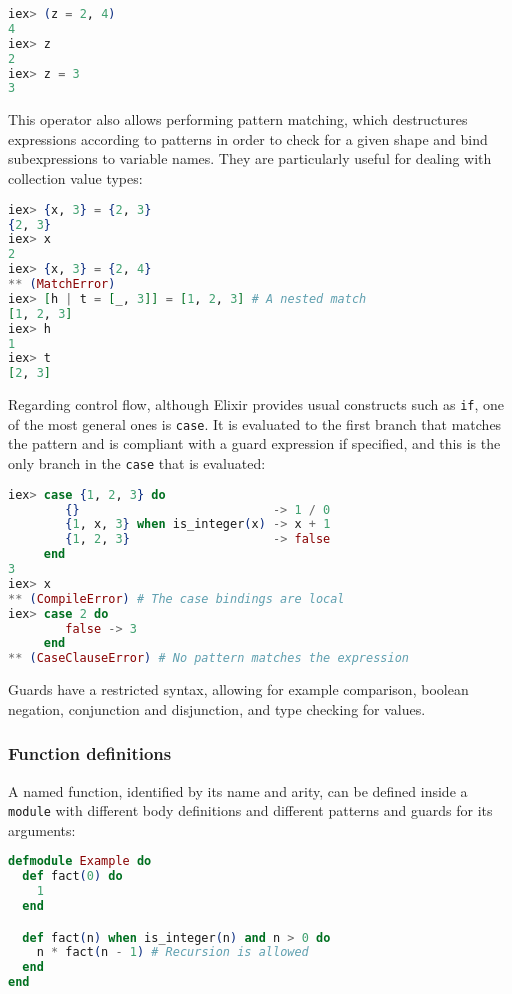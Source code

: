 \begin{lstlisting}[language=elixir,numbers=none,frame=none]
iex> (z = 2, 4)
4
iex> z
2
iex> z = 3
3
\end{lstlisting}

This operator also allows performing pattern matching, which destructures 
expressions according to patterns in order to check for a given shape and 
bind subexpressions to variable names. They are particularly useful for 
dealing with collection value types:

\begin{lstlisting}[language=elixir,numbers=none,frame=none]
iex> {x, 3} = {2, 3}
{2, 3}
iex> x
2
iex> {x, 3} = {2, 4}
** (MatchError)
iex> [h | t = [_, 3]] = [1, 2, 3] # A nested match
[1, 2, 3]
iex> h
1
iex> t
[2, 3]
\end{lstlisting}

Regarding control flow, although Elixir provides usual constructs such as 
\verb|if|, one of the most general ones is \verb|case|. It is evaluated to the
first branch that matches the pattern and is compliant with a guard expression
if specified, and this is the only branch in the \verb|case| that is evaluated:

\begin{lstlisting}[language=elixir,numbers=none,frame=none]
iex> case {1, 2, 3} do 
        {}                           -> 1 / 0
        {1, x, 3} when is_integer(x) -> x + 1
        {1, 2, 3}                    -> false
     end
3
iex> x
** (CompileError) # The case bindings are local
iex> case 2 do 
        false -> 3 
     end 
** (CaseClauseError) # No pattern matches the expression
\end{lstlisting}

Guards have a restricted syntax, allowing for example comparison, boolean 
negation, conjunction and disjunction, and type checking for values.

\subsubsection{Function definitions}

A named function, identified by its name and arity, can be defined inside a
\verb|module| with different body definitions and different patterns and guards
for its arguments:

\begin{lstlisting}[language=elixir,numbers=none,frame=none]
defmodule Example do 
  def fact(0) do 
    1
  end

  def fact(n) when is_integer(n) and n > 0 do 
    n * fact(n - 1) # Recursion is allowed
  end
end
\end{lstlisting}

